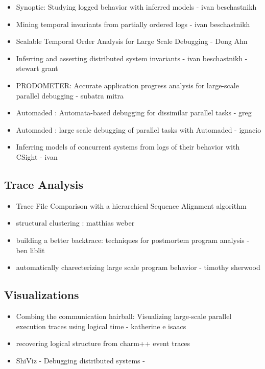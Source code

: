 \begin{itemize}
\item Synoptic: Studying logged behavior with inferred models - ivan beschastnikh \cite{beschastnikh-synoptic}
\item Mining temporal invariants from partially ordered logs -  ivan beschastnikh \cite{beschastnikh-pologs}
\item Scalable Temporal Order Analysis for Large Scale Debugging - Dong Ahn \cite{Ahn:2009}
\item Inferring and asserting distributed system invariants -  ivan beschastnikh - stewart grant \cite{grant18}
\item PRODOMETER: Accurate application progress analysis for large-scale parallel debugging - subatra mitra \cite{prodometer}
\item Automaded : Automata-based debugging for dissimilar parallel tasks - greg \cite{automaded-GBron}
\item Automaded : large scale debugging of parallel tasks with Automaded - ignacio \cite{automaded-laguna}

\item Inferring models of concurrent systems from logs of their behavior with CSight - ivan \cite{beschastnikh-csight}
\end{itemize}




\subsection{Trace Analysis}


\begin{itemize}
\item Trace File Comparison with a hierarchical Sequence Alignment algorithm \cite{weber-seqAlign}
\item structural clustering : matthias weber \cite{weberStructural}
\item building a better backtrace: techniques for postmortem program analysis - ben liblit \cite{liblit02}
\item automatically charecterizing large scale program behavior - timothy sherwood \cite{sherwood02}
\end{itemize}


\subsection{Visualizations}


\begin{itemize}
\item Combing the communication hairball: Visualizing large-scale parallel execution traces using logical time - katherine e isaacs \cite{ravel}
\item recovering logical structure from charm++ event traces \cite{charmVis}
\item ShiViz - Debugging distributed systems - \cite{shiviz}
\end{itemize}



